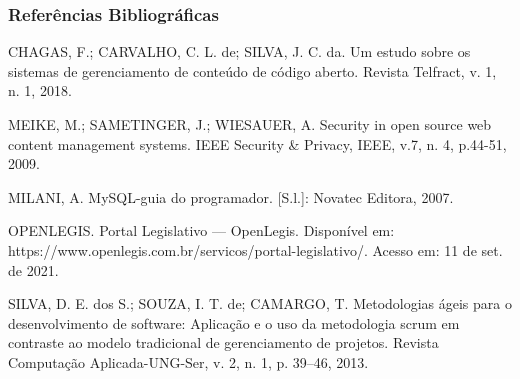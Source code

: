 \documentclass{beamer}
\begin{document}
\begin{frame}
    \frametitle{Referências Bibliográficas}
    \scriptsize{
        CHAGAS, F.; CARVALHO, C. L. de; SILVA, J. C. da. Um estudo sobre os sistemas de gerenciamento de conteúdo de código aberto. Revista Telfract, v. 1, n. 1, 2018. \newline
        
        MEIKE, M.; SAMETINGER, J.; WIESAUER, A. Security in open source web content management systems. IEEE Security & Privacy, IEEE, v.7, n. 4, p.44-51, 2009. \newline

        MILANI, A. MySQL-guia do programador. [S.l.]: Novatec Editora, 2007. \newline

        OPENLEGIS. Portal Legislativo — OpenLegis. Disponível em: https://www.openlegis.com.br/servicos/portal-legislativo/. Acesso em: 11 de set. de 2021. \newline

        SILVA, D. E. dos S.; SOUZA, I. T. de; CAMARGO, T. Metodologias ágeis para o desenvolvimento de software: Aplicação e o uso da metodologia scrum em contraste ao modelo tradicional de gerenciamento de projetos. Revista Computação Aplicada-UNG-Ser, v. 2, n. 1, p. 39–46, 2013. \newline
    }
\end{frame}
\end{document}
